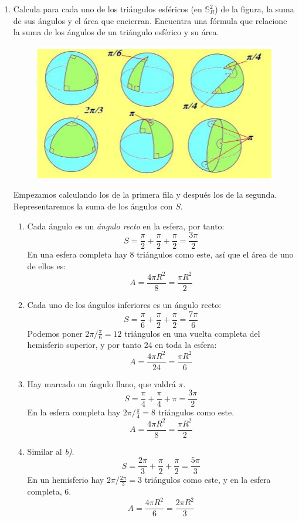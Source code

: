 \begin{enumerate}
\item Calcula para cada uno de los triángulos esféricos (en $\mathds{S}_R^2$) de la figura, la suma de sus ángulos y el área que encierran. Encuentra una fórmula que relacione la suma de los ángulos de un triángulo esférico y su área.


\begin{figure}[H]
	\centering
	\includegraphics[scale=0.9]{images/geometria_universo/pagina_13_1.png}
\end{figure}

Empezamos calculando los de la primera fila y después los de la segunda. Representaremos la suma de los ángulos con $S$.

	\begin{enumerate}
	\item Cada ángulo es un \textit{ángulo recto} en la esfera, por tanto:
	\[S = \frac{\pi}{2}+\frac{\pi}{2}+\frac{\pi}{2}=\frac{3\pi}{2}\]
	En una esfera completa hay 8 triángulos como este, así que el área de uno de ellos es:
	\[A = \frac{4\pi R^2}{8} = \frac{\pi R^2}{2}\]
	
	\item Cada uno de los ángulos inferiores es un ángulo recto:
	\[S = \frac{\pi}{6}+\frac{\pi}{2}+\frac{\pi}{2}=\frac{7\pi}{6}\]
	Podemos poner $2\pi/\frac{\pi}{6}=12$ triángulos en una vuelta completa del hemisferio superior, y por tanto 24 en toda la esfera:
	\[A = \frac{4\pi R^2}{24} = \frac{\pi R^2}{6}\]
	
	\item Hay marcado un ángulo llano, que valdrá $\pi$.
	\[S = \frac{\pi}{4}+\frac{\pi}{4}+\pi=\frac{3\pi}{2}\]
	En la esfera completa hay $2\pi/\frac{\pi}{4}=8$ triángulos como este.
	\[A = \frac{4\pi R^2}{8} = \frac{\pi R^2}{2}\]
	
	\item Similar al \textit{b)}.
	\[S = \frac{2\pi}{3}+\frac{\pi}{2}+\frac{\pi}{2} = \frac{5\pi}{3}\]
	En un hemisferio hay $2\pi/\frac{2\pi}{3}=3$ triángulos como este, y en la esfera completa, 6.
	\[A = \frac{4\pi R^2}{6} = \frac{2\pi R^2}{3}\]
	

\end{enumerate}
\end{enumerate}
